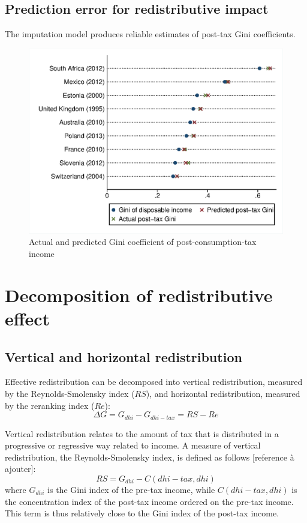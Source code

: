 \subsection{Prediction error for redistributive impact}
\label{sec:imputation_error}
The imputation model produces reliable estimates of post-tax Gini coefficients.
\begin{figure}
    \centering
    \includegraphics[height=0.45\textheight]{"images/19-02 prediction error ours mod2"}
    \caption{Actual and predicted Gini coefficient of post-consumption-tax income}
    \label{fig:prediction_error}
\end{figure}

\section{Decomposition of redistributive effect}

\subsection{Vertical and horizontal redistribution}
\label{sec:decomposition}
Effective redistribution can be decomposed into vertical redistribution, measured by the Reynolds-Smolensky index ($RS$), and horizontal redistribution, measured by the reranking index ($Re$):
\begin{equation}
 \label{equ:g_diff}
    \Delta G = G_{dhi} - G_{dhi-tax}  = RS - Re
\end{equation}

Vertical redistribution relates to the amount of tax that is distributed in a progressive or regressive way related to income. A measure of vertical redistribution, the Reynolds-Smolensky index, is defined as follows [reference à ajouter]:
\[ RS = G_{dhi} - C(dhi-tax, dhi) \]
where $G_{dhi}$ is the Gini index of the pre-tax income, while $C(dhi-tax,dhi)$ is the concentration index of the post-tax income ordered on the pre-tax income. This term is thus relatively close to the Gini index of the post-tax income.

